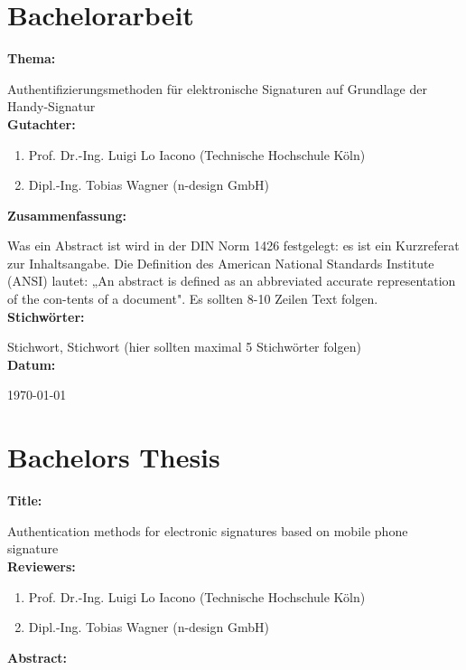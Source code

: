 \documentclass[11pt,a4paper,ngerman]{report}
\begin{document}
\maketitle

\chapter*{Bachelorarbeit}
\textbf{Thema:}

Authentifizierungsmethoden für elektronische Signaturen auf Grundlage der Handy-Signatur
\\[4ex]
\textbf{Gutachter:}
\begin{enumerate}
    \item Prof. Dr.-Ing. Luigi Lo Iacono (Technische Hochschule Köln)
    \item Dipl.-Ing. Tobias Wagner (n-design GmbH)
\end{enumerate}
\textbf{Zusammenfassung:}

Was ein Abstract ist wird in der DIN Norm 1426 festgelegt: es ist ein Kurzreferat zur Inhaltsangabe. Die Definition des American National Standards Institute (ANSI) lautet: „An abstract is defined as an abbreviated accurate representation of the con-tents of a document". Es sollten 8-10 Zeilen Text folgen.
\\[4ex]
\textbf{Stichwörter:}

Stichwort, Stichwort (hier sollten maximal 5 Stichwörter folgen)
\\[4ex]
\textbf{Datum:}

\today
\clearpage

\chapter*{Bachelors Thesis}
\textbf{Title:}

Authentication methods for electronic signatures based on mobile phone signature
\\[4ex]
\textbf{Reviewers:}
\begin{enumerate}
    \item Prof. Dr.-Ing. Luigi Lo Iacono (Technische Hochschule Köln)
    \item Dipl.-Ing. Tobias Wagner (n-design GmbH)
\end{enumerate}
\textbf{Abstract:}
\end{document}
